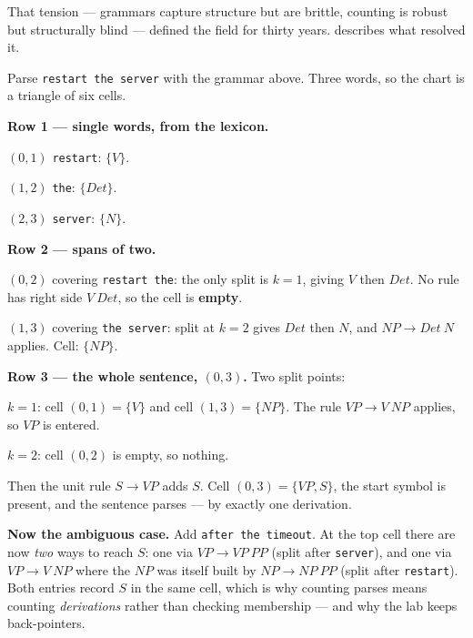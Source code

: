 That tension --- grammars capture structure but are brittle, counting is robust but
structurally blind --- defined the field for thirty years.  describes
what resolved it.

\begin{worked}
Parse \texttt{restart the server} with the grammar above. Three words, so the chart
is a triangle of six cells.

\smallskip
\textbf{Row 1 --- single words, from the lexicon.}
\begin{tight}
  \item $(0,1)$ \texttt{restart}: $\{V\}$.
  \item $(1,2)$ \texttt{the}: $\{\mathit{Det}\}$.
  \item $(2,3)$ \texttt{server}: $\{N\}$.
\end{tight}

\smallskip
\textbf{Row 2 --- spans of two.}
\begin{tight}
  \item $(0,2)$ covering \texttt{restart the}: the only split is $k=1$, giving
        $V$ then $\mathit{Det}$. No rule has right side $V\ \mathit{Det}$, so the
        cell is \textbf{empty}.
  \item $(1,3)$ covering \texttt{the server}: split at $k=2$ gives
        $\mathit{Det}$ then $N$, and $\mathit{NP} \to \mathit{Det}\ N$ applies.
        Cell: $\{\mathit{NP}\}$.
\end{tight}

\smallskip
\textbf{Row 3 --- the whole sentence, $(0,3)$.} Two split points:
\begin{tight}
  \item $k=1$: cell $(0,1) = \{V\}$ and cell $(1,3) = \{\mathit{NP}\}$. The rule
        $\mathit{VP} \to V\ \mathit{NP}$ applies, so $\mathit{VP}$ is entered.
  \item $k=2$: cell $(0,2)$ is empty, so nothing.
\end{tight}
Then the unit rule $S \to \mathit{VP}$ adds $S$. Cell $(0,3) = \{\mathit{VP}, S\}$,
the start symbol is present, and the sentence parses --- by exactly one derivation.

\smallskip
\textbf{Now the ambiguous case.} Add \texttt{after the timeout}. At the top cell
there are now \emph{two} ways to reach $S$: one via
$\mathit{VP} \to \mathit{VP}\ \mathit{PP}$ (split after \texttt{server}), and one
via $\mathit{VP} \to V\ \mathit{NP}$ where the $\mathit{NP}$ was itself built by
$\mathit{NP} \to \mathit{NP}\ \mathit{PP}$ (split after \texttt{restart}). Both
entries record $S$ in the same cell, which is why counting parses means counting
\emph{derivations} rather than checking membership --- and why the lab keeps
back-pointers.
\end{worked}


